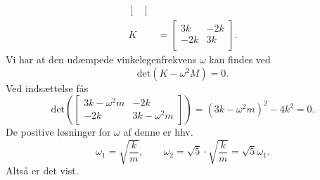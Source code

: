 \begin{derivation}
\begin{align*}
\begin{bmatrix}
    \end{bmatrix} \\
      K &= \begin{bmatrix}
      3k & -2k\\
      -2k & 3k\\
      \end{bmatrix}
  .\end{align*}
  Vi har at den udæmpede vinkelegenfrekvens $\omega$ kan findes ved
  \[ 
  \mathrm{det} \left( K - \omega^2 M \right) = 0
  .\]
  Ved indsættelse fås
  \begin{equation*}
    \mathrm{det}\left( \begin{bmatrix}
    3k - \omega^2 m &  - 2k \\
    - 2k & 3k - \omega^2 m\\
    \end{bmatrix} \right) = \left( 3k - \omega^2 m \right)^2 - 4 k^2 = 0
  .\end{equation*}
  De positive løsninger for $\omega$ af denne er hhv.
  \[ 
    \omega_1 = \sqrt{\frac{k}{m}}, \qquad \omega_2 = \sqrt{5} \cdot \sqrt{\frac{k}{m}} = \sqrt{5} \omega_1
  .\]
  Altså er det vist.


\end{derivation}
